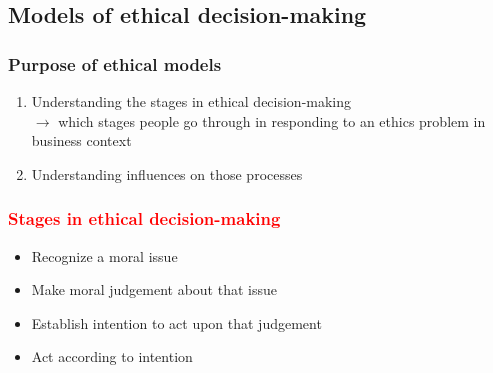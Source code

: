 \documentclass{article}
\DeclareRobustCommand{\k}[1]{\textcolor{red}{#1}}
\begin{document}
\newpage
\subsection{Models of ethical decision-making}
\subsubsection{Purpose of ethical models}
\begin{enumerate}
    \item Understanding the stages in ethical decision-making\\
    $\to$ which stages people go through in responding to an ethics problem in business context
    \item Understanding influences on those processes
\end{enumerate}

\subsubsection{\k{Stages in ethical decision-making}}
\begin{itemize}
    \item Recognize a moral issue
    \item Make moral judgement about that issue
    \item Establish intention to act upon that judgement
    \item Act according to intention
\end{itemize}
\end{document}
